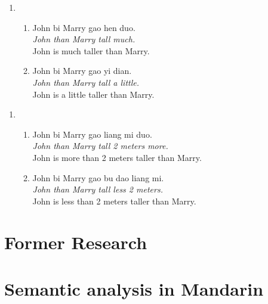 \documentclass{ctexart}
\begin{document}
\begin{enumerate}[resume]
    \item
    \begin{enumerate}[ref=(\arabic{enumi}\alph*)]
        \item \label{dp_big_vague_example}
        John bi Marry gao hen duo.\\
        \textit{John than Marry tall much.} \\
        John is much taller than Marry.

        \item \label{dp_small_vague_example}
        John bi Marry gao yi dian.\\
        \textit{John than Marry tall a little.}\\
        John is a little taller than Marry.

    \end{enumerate}
\end{enumerate}

\begin{enumerate}[resume]
    \item
    \begin{enumerate}[ref=(\arabic{enumi}\alph*)]
        \item \label{dp_value_big_vague_example}
        John bi Marry gao liang mi duo.\\
        \textit{John than Marry tall 2 meters more.} \\
        John is more than 2 meters taller than Marry.

        \item \label{dp_value_small_vague_example}
        John bi Marry gao bu dao liang mi.\\
        \textit{John than Marry tall less 2 meters.} \\
        John is less than 2 meters taller than Marry.
    \end{enumerate}
\end{enumerate}



\section{Former Research}



\section{Semantic analysis in Mandarin}
\end{document}
